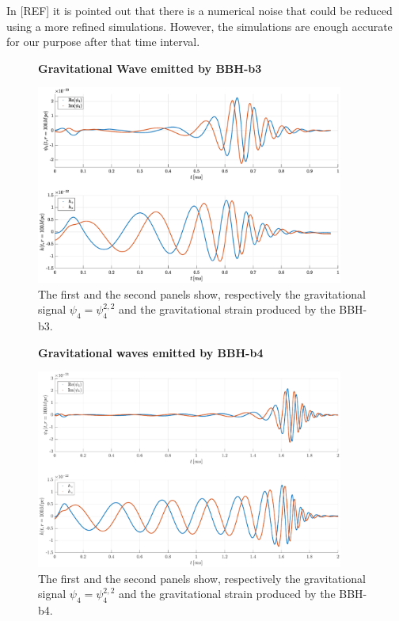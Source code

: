 In [REF] it is pointed out that there is a numerical noise that could be reduced using a more refined simulations. However,   the simulations are enough accurate for our purpose after that time interval.\\ 
\begin{figure}[H]
\centering
    \textbf{Gravitational Wave emitted by BBH-b3}\par\medskip
\centering
\includegraphics[width=0.9\textwidth]{numerical_evolution/gw_b3.eps}
\caption{The first and the second panels show, respectively the gravitational signal $\psi_4=\psi_4 ^{2,2}$ and the gravitational strain produced by the BBH-b3.}
   \label{gw_b3}
 \end{figure}
\begin{figure}[H]
\centering
    \textbf{Gravitational waves emitted by BBH-b4}\par\medskip
\centering
   \includegraphics[width=0.9\textwidth]{numerical_evolution/gw_b4.eps}
   \caption{The first and the second panels show, respectively the gravitational signal $\psi_4=\psi_4 ^{2,2}$ and the gravitational strain produced by the BBH-b4.}
\label{gw_b4} 
\end{figure}
